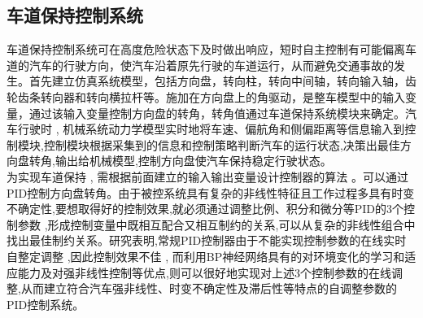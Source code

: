 \documentclass[a4paper,12pt]{article}
\begin{document}
\begin{CJK*}{UTF8}{gbsn}
	\subsection{车道保持控制系统}
	车道保持控制系统可在高度危险状态下及时做出响应，短时自主控制有可能偏离车道的汽车的行驶方向，使汽车沿着原先行驶的车道运行，从而避免交通事故的发生。首先建立仿真系统模型，包括方向盘，转向柱，转向中间轴，转向输入轴，齿轮齿条转向器和转向横拉杆等。施加在方向盘上的角驱动，是整车模型中的输入变量，通过该输入变量控制方向盘的转角，转角值通过车道保持系统模块来确定。汽车行驶时 , 机械系统动力学模型实时地将车速、偏航角和侧偏距离等信息输入到控制模块,控制模块根据采集到的信息和控制策略判断汽车的运行状态,决策出最佳方向盘转角,输出给机械模型,控制方向盘使汽车保持稳定行驶状态。\\
	为实现车道保持 , 需根据前面建立的输入输出变量设计控制器的算法 。可以通过PID控制方向盘转角。由于被控系统具有复杂的非线性特征且工作过程多具有时变不确定性,要想取得好的控制效果,就必须通过调整比例、积分和微分等PID的3个控制参数 ,形成控制变量中既相互配合又相互制约的关系,可以从复杂的非线性组合中找出最佳制约关系。研究表明,常规PID控制器由于不能实现控制参数的在线实时自整定调整 ,因此控制效果不佳 , 而利用BP神经网络具有的对环境变化的学习和适应能力及对强非线性控制等优点,则可以很好地实现对上述3个控制参数的在线调整,从而建立符合汽车强非线性、时变不确定性及滞后性等特点的自调整参数的PID控制系统。

\end{CJK*}
\end{document}
